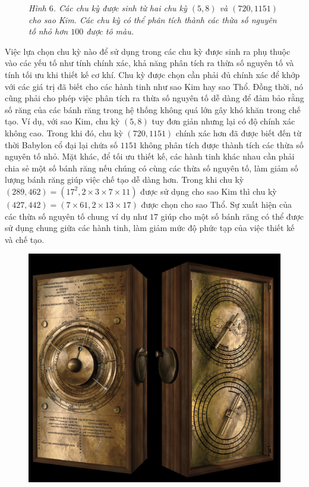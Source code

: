\begin{multicols}{2}
\begin{figure}[H]
		\caption{\small\textit{\color{lichsutoanhoc}Hình $6$. Các chu kỳ được sinh từ hai chu kỳ $(5,8)$ và $(720,1151)$ cho sao Kim. Các chu kỳ có thể phân tích thành các thừa số nguyên tố nhỏ hơn $100$ được tô màu.}}
		\vspace*{-10pt}
	\end{figure}
	Việc lựa chọn chu kỳ nào để sử dụng trong các chu kỳ được sinh ra phụ thuộc vào các yếu tố như tính chính xác, khả năng phân tích ra thừa số nguyên tố và tính tối ưu khi thiết kế cơ khí. Chu kỳ được chọn cần phải đủ chính xác để khớp với các giá trị đã biết cho các hành tinh như sao Kim hay sao Thổ. Đồng thời, nó cũng phải cho phép việc phân tích ra thừa số nguyên tố dễ dàng để đảm bảo rằng số răng của các bánh răng trong hệ thống không quá lớn gây khó khăn trong chế tạo. Ví dụ, với sao Kim, chu kỳ $(5,8)$ tuy đơn giản nhưng lại có độ chính xác không cao. Trong khi đó, chu kỳ $(720,1151)$ chính xác hơn đã được biết đến từ thời Babylon cổ đại lại chứa số $1151$ không phân tích được thành tích các thừa số nguyên tố nhỏ. Mặt khác, để tối ưu thiết kế, các hành tinh khác nhau cần phải chia sẻ một số bánh răng nếu chúng có cùng các thừa số nguyên tố, làm giảm số lượng bánh răng giúp việc chế tạo dễ dàng hơn. Trong khi chu kỳ $(289,462)=(17^2,2\times3\times7\times11)$ được sử dụng cho sao Kim thì chu kỳ $(427,442)=(7\times61,2\times13\times17)$ được chọn cho sao Thổ. Sự xuất hiện của các thừa số nguyên tố chung ví dụ như $17$ giúp cho một số bánh răng có thể được sử dụng chung giữa các hành tinh, làm giảm mức độ phức tạp của việc thiết kế và chế tạo.
	\begin{figure}[H]
		\vspace*{-5pt}
		\centering
		\captionsetup{labelformat= empty, justification=centering}
		\includegraphics[width= 1\linewidth]{8}

\end{figure}
\end{multicols}
